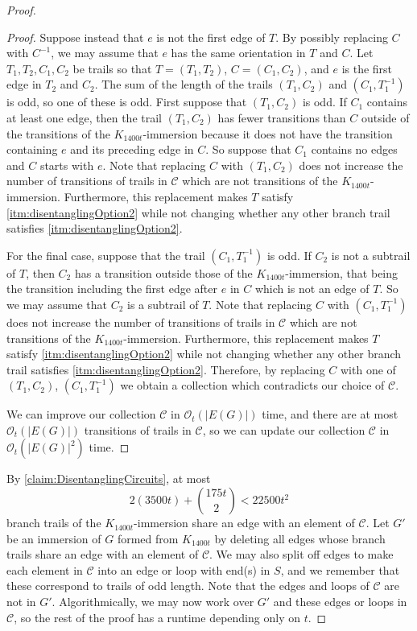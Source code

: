\documentclass{article}
\theoremstyle{definition}
\begin{document}
\begin{proof}
\begin{proof}
        Suppose instead that $e$ is not the first edge of $T$. By possibly replacing $C$ with $C^{-1}$, we may assume that $e$ has the same orientation in $T$ and $C$. Let $T_1, T_2, C_1, C_2$ be trails so that $T = (T_1, T_2)$,  $C = (C_1, C_2)$, and $e$ is the first edge in $T_2$ and $C_2$. The sum of the length of the trails $(T_1, C_2)$ and $(C_1, T_1^{-1})$ is odd, so one of these is odd. First suppose that $(T_1, C_2)$ is odd. If $C_1$ contains at least one edge, then the trail $(T_1, C_2)$ has fewer transitions than $C$ outside of the transitions of the $K_{1400t}$-immersion because it does not have the transition containing $e$ and its preceding edge in $C$. So suppose that $C_1$ contains no edges and $C$ starts with $e$. Note that replacing $C$ with $(T_1, C_2)$ does not increase the number of transitions of trails in $\mathcal{C}$ which are not transitions of the $K_{1400t}$-immersion. Furthermore, this replacement makes $T$ satisfy \cref{itm:disentanglingOption2} while not changing whether any other branch trail satisfies \cref{itm:disentanglingOption2}.
        
        For the final case, suppose that the trail $(C_1, T_1^{-1})$ is odd. If $C_2$ is not a subtrail of $T$, then $C_2$ has a transition outside those of the $K_{1400t}$-immersion, that being the transition including the first edge after $e$ in $C$ which is not an edge of $T$. So we may assume that $C_2$ is a subtrail of $T$. Note that replacing $C$ with $(C_1, T_1^{-1})$ does not increase the number of transitions of trails in $\mathcal{C}$ which are not transitions of the $K_{1400t}$-immersion. Furthermore, this replacement makes $T$ satisfy \cref{itm:disentanglingOption2} while not changing whether any other branch trail satisfies \cref{itm:disentanglingOption2}. Therefore, by replacing $C$ with one of $(T_1, C_2)$, $(C_1, T_1^{-1})$ we obtain a collection which contradicts our choice of $\mathcal{C}$.

        We can improve our collection $\mathcal{C}$ in $\mathcal{O}_t(|E(G)|)$ time, and there are at most $\mathcal{O}_t(|E(G)|)$ transitions of trails in $\mathcal{C}$, so we can update our collection $\mathcal{C}$ in $\mathcal{O}_t(|E(G)|^2)$ time.
    \end{proof}
    
    By \cref{claim:DisentanglingCircuits}, at most
    $$2(3500t) + \binom{175t}{2} < 22500t^2$$
    branch trails of the $K_{1400t}$-immersion share an edge with an element of $\mathcal{C}$. Let $G'$ be an immersion of $G$ formed from $K_{1400t}$ by deleting all edges whose branch trails share an edge with an element of $\mathcal{C}$. We may also split off edges to make each element in $\mathcal{C}$ into an edge or loop with end(s) in $S$, and we remember that these correspond to trails of odd length. Note that the edges and loops of $\mathcal{C}$ are not in $G'$. Algorithmically, we may now work over $G'$ and these edges or loops in $\mathcal{C}$, so the rest of the proof has a runtime depending only on $t$.


\end{proof}
\end{document}
